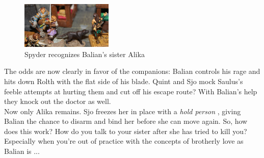 \begin{figure}[h]
	\centering
	\includegraphics[width=0.39\textwidth]{images/Spyder-recognizes-Balian-s-sister-Alika-520054718.jpg}
	\caption{Spyder recognizes Balian's sister Alika}
	\label{fig:Spyder-recognizes-Balian-s-sister-Alika-520054718}
\end{figure}

The odds are now clearly in favor of the companions: Balian controls his rage and hits down Rolth with the flat side of his blade. Quint and Sjo mock Saulus's feeble attempts at hurting them and cut off his escape route? With Balian's help they knock out the doctor as well.\\

Now only Alika remains. Sjo freezes her in place with a {\itshape hold person} , giving Balian the chance to disarm and bind her before she can move again. So, how does this work? How do you talk to your sister after she has tried to kill you? Especially when you're out of practice with the concepts of brotherly love as Balian is ... 